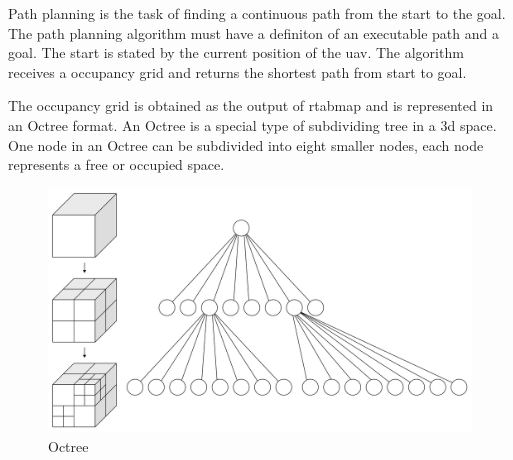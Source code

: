 Path planning is the task of finding a continuous path from the start to the goal. The path planning algorithm must have a definiton of an executable path and a goal. The start is stated by the current position of the \acs{uav}. The algorithm receives a occupancy grid and returns the shortest path from start to goal. \cite{KLANCAR2017161}

The occupancy grid is obtained as the output of \acs{rtabmap} and is represented in an Octree format. An Octree is a special type of subdividing tree in a \acs{3d} space. One node in an Octree can be subdivided into eight smaller nodes, each node represents a free or occupied space. \cite{octrees_gamedev}

\begin{figure}[!h]
  \centering
  \includegraphics[width=0.6\linewidth]{images/octree.png}
  \caption{Octree \cite{octrees_gamedev}}
\end{figure}